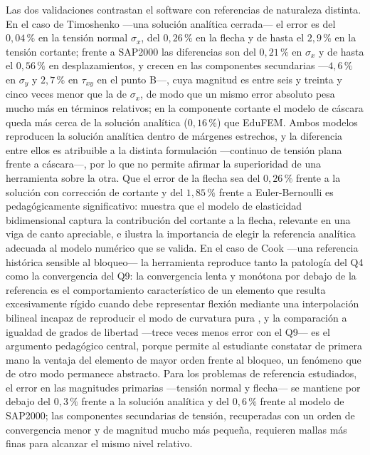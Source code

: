 Las dos validaciones contrastan el software con referencias de naturaleza distinta. En el caso de Timoshenko —una solución analítica cerrada— el error es del $0{,}04\,\%$ en la tensión normal $\sigma_x$, del $0{,}26\,\%$ en la flecha y de hasta el $2{,}9\,\%$ en la tensión cortante; frente a SAP2000 las diferencias son del $0{,}21\,\%$ en $\sigma_x$ y de hasta el $0{,}56\,\%$ en desplazamientos, y crecen en las componentes secundarias —$4{,}6\,\%$ en $\sigma_y$ y $2{,}7\,\%$ en $\tau_{xy}$ en el punto B—, cuya magnitud es entre seis y treinta y cinco veces menor que la de $\sigma_x$, de modo que un mismo error absoluto pesa mucho más en términos relativos; en la componente cortante el modelo de cáscara queda más cerca de la solución analítica ($0{,}16\,\%$) que EduFEM. Ambos modelos reproducen la solución analítica dentro de márgenes estrechos, y la diferencia entre ellos es atribuible a la distinta formulación —continuo de tensión plana frente a cáscara—, por lo que no permite afirmar la superioridad de una herramienta sobre la otra. Que el error de la flecha sea del $0{,}26\,\%$ frente a la solución con corrección de cortante y del $1{,}85\,\%$ frente a Euler-Bernoulli es pedagógicamente significativo: muestra que el modelo de elasticidad bidimensional captura la contribución del cortante a la flecha, relevante en una viga de canto apreciable, e ilustra la importancia de elegir la referencia analítica adecuada al modelo numérico que se valida. En el caso de Cook —una referencia histórica sensible al bloqueo— la herramienta reproduce tanto la patología del Q4 como la convergencia del Q9: la convergencia lenta y monótona por debajo de la referencia es el comportamiento característico de un elemento que resulta excesivamente rígido cuando debe representar flexión mediante una interpolación bilineal incapaz de reproducir el modo de curvatura pura \autocites[pp.~98-99]{cook2002concepts}[p.~476]{bathe2014fem}, y la comparación a igualdad de grados de libertad —trece veces menos error con el Q9— es el argumento pedagógico central, porque permite al estudiante constatar de primera mano la ventaja del elemento de mayor orden frente al bloqueo, un fenómeno que de otro modo permanece abstracto. Para los problemas de referencia estudiados, el error en las magnitudes primarias —tensión normal y flecha— se mantiene por debajo del $0{,}3\,\%$ frente a la solución analítica y del $0{,}6\,\%$ frente al modelo de SAP2000; las componentes secundarias de tensión, recuperadas con un orden de convergencia menor y de magnitud mucho más pequeña, requieren mallas más finas para alcanzar el mismo nivel relativo.

